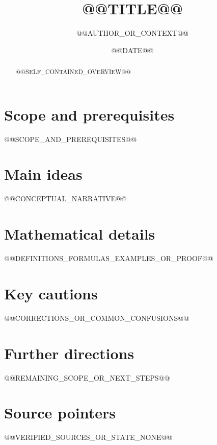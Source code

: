 \documentclass[11pt,a4paper]{article}
\title{@@TITLE@@}
\author{@@AUTHOR_OR_CONTEXT@@}
\date{@@DATE@@}
\theoremstyle{definition}
\theoremstyle{remark}
\begin{document}
\maketitle

\begin{abstract}
@@SELF_CONTAINED_OVERVIEW@@
\end{abstract}

\section{Scope and prerequisites}
@@SCOPE_AND_PREREQUISITES@@

\section{Main ideas}
@@CONCEPTUAL_NARRATIVE@@

\section{Mathematical details}
@@DEFINITIONS_FORMULAS_EXAMPLES_OR_PROOF@@

\section{Key cautions}
@@CORRECTIONS_OR_COMMON_CONFUSIONS@@

\section{Further directions}
@@REMAINING_SCOPE_OR_NEXT_STEPS@@

\section*{Source pointers}
@@VERIFIED_SOURCES_OR_STATE_NONE@@
\end{document}

